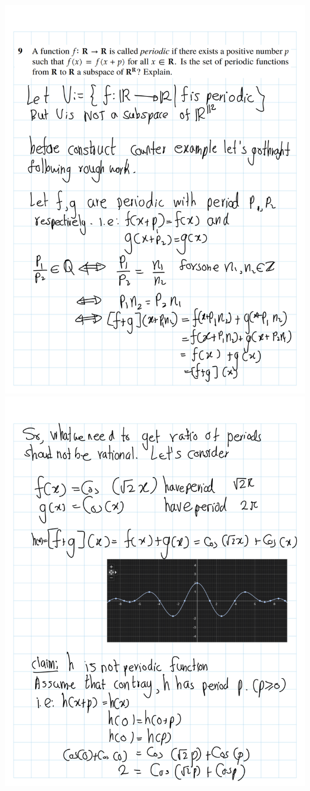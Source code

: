 \documentclass[
]{book}
\theoremstyle{definition}
\theoremstyle{definition}
\theoremstyle{definition}
\theoremstyle{definition}
\theoremstyle{remark}
\begin{document}
\begin{enumerate}
  \includegraphics{fig/Ex1C/Ex/Ex-06.png}
  \includegraphics{fig/Ex1C/Ex/Ex-07.png}

\end{enumerate}
\end{document}
